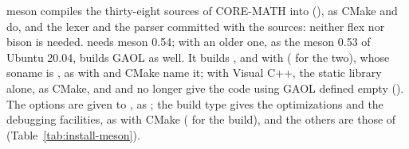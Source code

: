 \noindent
meson compiles the thirty-eight sources of CORE-MATH into 
(), as CMake and  do, and the lexer and
the parser committed with the sources: neither flex nor bison is needed.
 needs meson 0.54; with an older one, as the meson 0.53 of
Ubuntu 20.04,  builds GAOL as well. It builds
, and  with
 ( for the two), whose soname is
, as  with  and
CMake name it; with Visual C++, the static library alone, as CMake, and
 and  no longer give the code using GAOL
 defined empty ().\newinvfive{}
The options are given to , as
; the build type gives the optimizations
and the debugging facilities, as with CMake ( for
the  build), and the others are those of 
(Table~\ref{tab:install-meson}).

